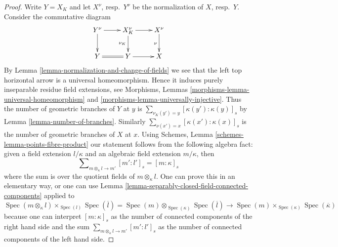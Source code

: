 \documentclass[10pt,a4paper]{amsart}
\theoremstyle{plain}
\theoremstyle{definition}
\theoremstyle{remark}
\numberwithin{equation}{subsection}
\def\Spec{\mathop{\mathrm{Spec}}}
\begin{document}
\begin{proof}
Write $Y = X_K$ and let $X^\nu$, resp.\ $Y^\nu$ be the normalization
of $X$, resp.\ $Y$. Consider the commutative diagram
$$
\xymatrix{
Y^\nu \ar[r] \ar[d] & X^\nu_K \ar[r] \ar[d]_{\nu_K} & X^\nu \ar[d]_\nu \\
Y \ar@{=}[r] & Y \ar[r] & X
}
$$
By Lemma \ref{lemma-normalization-and-change-of-fields} we see that
the left top horizontal arrow is a universal homeomorphism.
Hence it induces purely inseparable residue field extensions, see
Morphisms, Lemmas \ref{morphisms-lemma-universal-homeomorphism} and
\ref{morphisms-lemma-universally-injective}.
Thus the number of geometric branches of $Y$ at $y$ is
$\sum_{\nu_K(y') = y} [\kappa(y') : \kappa(y)]_s$
by Lemma \ref{lemma-number-of-branches}. Similarly
$\sum_{\nu(x') = x} [\kappa(x') : \kappa(x)]_s$ is the number of
geometric branches of $X$ at $x$. Using Schemes, Lemma
\ref{schemes-lemma-points-fibre-product}
our statement follows from the following algebra fact:
given a field extension $l/\kappa$ and
an algebraic field extension $m/\kappa$, then
$$
\sum\nolimits_{m \otimes_\kappa l \to m'} [m' : l']_s = [m : \kappa]_s
$$
where the sum is over the quotient fields of $m \otimes_\kappa l$.
One can prove this in an elementary way, or one can use
Lemma \ref{lemma-separably-closed-field-connected-components}
applied to
$$
\Spec(m \otimes_\kappa l) \times_{\Spec(l)} \Spec(\overline{l}) =
\Spec(m) \otimes_{\Spec(\kappa)} \Spec(\overline{l})
\longrightarrow
\Spec(m) \times_{\Spec(\kappa)} \Spec(\overline{\kappa})
$$
because one can interpret $[m : \kappa]_s$ as the number of
connected components of the right hand side and the sum
$\sum_{m \otimes_\kappa l \to m'} [m' : l']_s$
as the number of connected components of the left hand side.
\end{proof}
\end{document}
